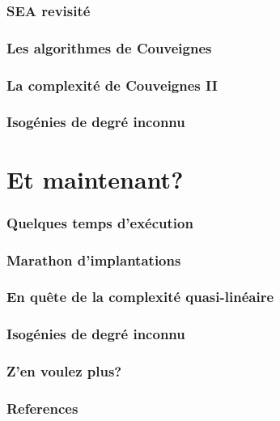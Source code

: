 \documentclass[10pt]{beamer}
\newcommand{\0}{\mathcal{O}}  %
\begin{document}

\begin{frame}
  \frametitle{SEA revisité}
  \cite{silverman:elliptic}  
\end{frame}


\begin{frame}
  \frametitle{Les algorithmes de Couveignes}
  
\end{frame}


\begin{frame}
  \frametitle{La complexité de Couveignes II}
  
\end{frame}


\begin{frame}
  \frametitle{Isogénies de degré inconnu}
  
\end{frame}


\section{Et maintenant?}

\begin{frame}
  \frametitle{Quelques temps d'exécution}
  
\end{frame}


\begin{frame}
  \frametitle{Marathon d'implantations}

\end{frame}


\begin{frame}
  \frametitle{En quête de la complexité quasi-linéaire}
  
\end{frame}


\begin{frame}
  \frametitle{Isogénies de degré inconnu}
  
\end{frame}


\begin{frame}
  \frametitle{Z'en voulez plus?}
  
\end{frame}


\begin{frame}[allowframebreaks]
  \frametitle{References}

  \beamertemplatebookbibitems
  \printbibliography[type=book]
  \framebreak
  \beamertemplatearticlebibitems
  \printbibliography[nottype=book]
\end{frame}
\end{document}
